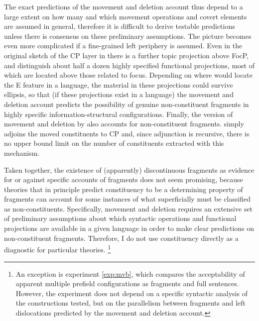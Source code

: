 The exact predictions of the movement and deletion account thus depend to a large extent on how many and which movement operations and covert elements are assumed in general, therefore it is difficult to derive testable predictions unless there is consensus on these preliminary assumptions. The picture becomes even more complicated if a fine-grained left periphery is assumed. Even in the original sketch of the CP layer in \citet{rizzi1997} there is a further topic projection above FocP, and \citet{beninca.poletto2004} distinguish about half a dozen highly specified functional projections, most of which are located above those related to focus. Depending on where \citet{merchant2004} would locate the E feature in a language, the material in these projections could survive ellipsis, so that (if these projections exist in a language) the movement and deletion account predicts the possibility of genuine non-constituent fragments in highly specific information-structural configurations. Finally, the version of movement and deletion by \citet{weir2014} also accounts for non-constituent fragments. \citeauthor{weir2014} simply adjoins the moved constituents to CP and, since adjunction is recursive, there is no upper bound limit on the number of constituents extracted with this mechanism.

Taken together, the existence of (apparently) discontinuous fragments as evidence for or against specific accounts of fragments does not seem promising, because theories that in principle predict constituency to be a determining property of fragments can account for some instances of what superficially must be classified as non-constituents. Specifically, movement and deletion requires an extensive set of preliminary assumptions about which syntactic operations and functional projections are available in a given language in order to make clear predictions on non-constituent fragments. Therefore, I do not use constituency directly as a diagnostic for particular theories.%
%
\footnote{An exception is experiment \ref{exp:mvb}, which compares the acceptability of apparent multiple prefield configurations as fragments and full sentences. However, the experiment does not depend on a specific syntactic analysis of the constructions tested, but on the parallelism between fragments and left dislocations predicted by the movement and deletion account.}\afterfn%
%

